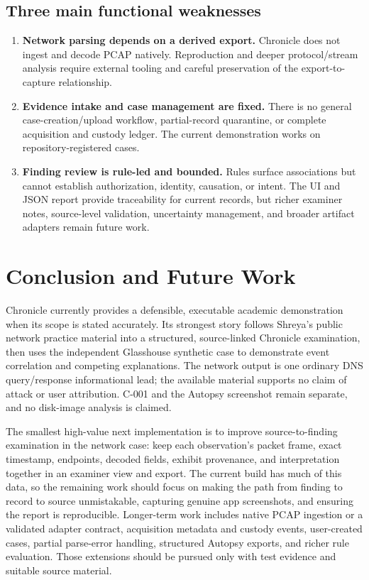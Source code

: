 \documentclass[12pt,a4paper]{report}
\begin{document}
\section{Three main functional weaknesses}
\begin{enumerate}
\item \textbf{Network parsing depends on a derived export.} Chronicle does not ingest and decode PCAP natively. Reproduction and deeper protocol/stream analysis require external tooling and careful preservation of the export-to-capture relationship.
\item \textbf{Evidence intake and case management are fixed.} There is no general case-creation/upload workflow, partial-record quarantine, or complete acquisition and custody ledger. The current demonstration works on repository-registered cases.
\item \textbf{Finding review is rule-led and bounded.} Rules surface associations but cannot establish authorization, identity, causation, or intent. The UI and JSON report provide traceability for current records, but richer examiner notes, source-level validation, uncertainty management, and broader artifact adapters remain future work.
\end{enumerate}

\chapter{Conclusion and Future Work}
Chronicle currently provides a defensible, executable academic demonstration when its scope is stated accurately. Its strongest story follows Shreya's public network practice material into a structured, source-linked Chronicle examination, then uses the independent Glasshouse synthetic case to demonstrate event correlation and competing explanations. The network output is one ordinary DNS query/response informational lead; the available material supports no claim of attack or user attribution. C-001 and the Autopsy screenshot remain separate, and no disk-image analysis is claimed.

The smallest high-value next implementation is to improve source-to-finding examination in the network case: keep each observation's packet frame, exact timestamp, endpoints, decoded fields, exhibit provenance, and interpretation together in an examiner view and export. The current build has much of this data, so the remaining work should focus on making the path from finding to record to source unmistakable, capturing genuine app screenshots, and ensuring the report is reproducible. Longer-term work includes native PCAP ingestion or a validated adapter contract, acquisition metadata and custody events, user-created cases, partial parse-error handling, structured Autopsy exports, and richer rule evaluation. Those extensions should be pursued only with test evidence and suitable source material.
\end{document}
